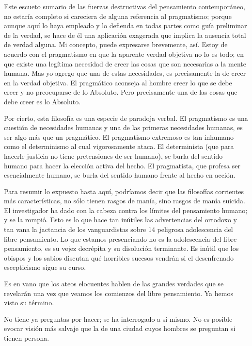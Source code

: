 Este escueto sumario de las fuerzas destructivas del pensamiento contemporáneo, no estaría
completo si careciera de alguna referencia al pragmatismo; porque aunque aquí lo haya empleado y lo
defienda en todas partes como guía preliminar de la verdad, se hace de él una aplicación exagerada que
implica la ausencia total de verdad alguna. Mi concepto, puede expresarse brevemente, así. Estoy de
acuerdo con el pragmatismo en que la aparente verdad objetiva no lo es todo; en que existe una legítima
necesidad de creer las cosas que son necesarias a la mente humana. Mas yo agrego que una de estas
necesidades, es precisamente la de creer en la verdad objetiva. El pragmático aconseja al hombre creer lo
que se debe creer y no preocuparse de lo Absoluto. Pero precisamente una de las cosas que debe creer es
lo Absoluto. 

Por cierto, esta filosofía es una especie de paradoja verbal. El pragmatismo es una cuestión de
necesidades humanas y una de las primeras necesidades humanas, es ser algo más que un pragmático. El
pragmatismo extremoso es tan inhumano como el determinismo al cual vigorosamente ataca. El
determinista (que para hacerle justicia no tiene pretensiones de ser humano), se burla del sentido humano
para hacer la elección activa del hecho. El pragmatista, que profesa ser esencialmente humano, se burla
del sentido humano frente al hecho en acción.

Para resumir lo expuesto hasta aquí, podríamos decir que las filosofías corrientes más
características, no sólo tienen rasgos de manía, sino rasgos de manía suicida. El investigador ha dado con
la cabeza contra los límites del pensamiento humano; y se la rompió. Esto es lo que hace tan inútiles las
advertencias del ortodoxo y tan vana la jactancia de los vanguardistas sobre 14 peligrosa adolescencia del
libre pensamiento. Lo que estamos presenciando no es la adolescencia del libre pensamiento, es su vejez
decrépita y su disolución terminante. Es inútil que los obispos y los sabios discutan qué horribles sucesos
vendrán si el desenfrenado escepticismo sigue su curso.

Es en vano que los ateos elocuentes hablen de las grandes verdades que se revelarán una vez que
veamos los comienzos del libre pensamiento. Ya hemos visto su término.

No tiene ya preguntas por hacer; se ha interrogado a sí mismo. No es posible evocar visión más
salvaje que la de una ciudad cuyos hombres se preguntan si tienen persona.

